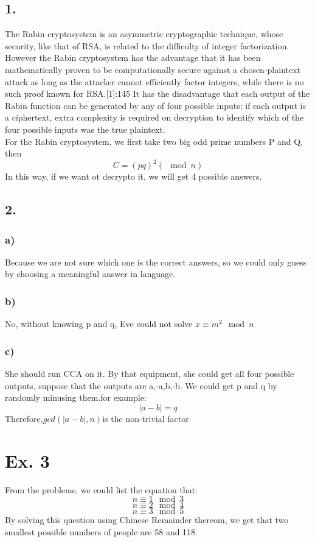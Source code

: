 \documentclass[a4paper,12pt]{journal}
\begin{document}
\subsection*{1. }
The Rabin cryptosystem is an asymmetric cryptographic technique, whose security, like that of RSA, is related to the difficulty of integer factorization. However the Rabin cryptosystem has the advantage that it has been mathematically proven to be computationally secure against a chosen-plaintext attack as long as the attacker cannot efficiently factor integers, while there is no such proof known for RSA.[1]:145 It has the disadvantage that each output of the Rabin function can be generated by any of four possible inputs; if each output is a ciphertext, extra complexity is required on decryption to identify which of the four possible inputs was the true plaintext.\\
For the Rabin cryptosystem, we first take two big odd prime numbers P and Q, then 
$$C=(pq)^2(\mod n)$$
In this way, if we want ot decrypto it, we will get 4 possible answers.
\subsection*{2. }
\subsubsection*{a)}
Because we are not sure which one is the correct answers, so we could only guess by choosing a meaningful answer in language.
\subsubsection*{b)}
No, without knowing p and q, Eve could not solve $x\equiv m^2\mod n$
\subsubsection*{c)}
She should run CCA on it. By that equipment, she could get all four possible outputs, suppose that the outputs are a,-a,b,-b. We could get p and q by randomly minusing them.for example:
$$|a-b|=q$$
Therefore,$gcd(|a-b|,n)$is the non-trivial factor
\section*{Ex. 3}
From the problems, we could list the equation that:
$$n\equiv 1 \mod 3$$
$$n\equiv 2 \mod 4$$
$$n\equiv 3 \mod 5$$
By solving this question using Chinese Remainder thereom, we get that two smallest possible numbers of people are 58 and 118.
\end{document}
